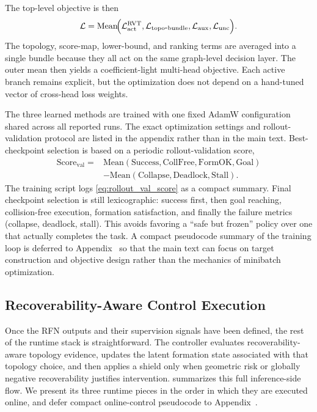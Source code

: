 \documentclass{ieeeaccess}
\begin{document}
The top-level objective is then
\begin{equation}
\mathcal{L}
= \mathrm{Mean}\!\Bigl(
\mathcal{L}^{\mathrm{RVT}}_{\mathrm{act}},
\mathcal{L}_{\mathrm{topo\mbox{-}bundle}},
\mathcal{L}_{\mathrm{aux}},
\mathcal{L}_{\mathrm{unc}}
\Bigr).
\label{eq:loss}
\end{equation}
The topology, score-map, lower-bound, and ranking terms are averaged
into a single bundle because they all act on the same graph-level
decision layer. The outer mean then yields a coefficient-light
multi-head objective. Each active branch remains explicit, but the
optimization does not depend on a hand-tuned vector of cross-head loss
weights.

The three learned methods are trained with one fixed AdamW
configuration shared across all reported runs. The exact optimization
settings and rollout-validation protocol are listed in the appendix
rather than in the main text. Best-checkpoint selection is based on a
periodic rollout-validation score,
\begin{equation}
\begin{aligned}
\mathrm{Score}_{\mathrm{val}} ={}&
\mathrm{Mean}(\mathrm{Success}, \mathrm{CollFree}, \mathrm{FormOK}, \mathrm{Goal}) \\
&- \mathrm{Mean}(\mathrm{Collapse}, \mathrm{Deadlock}, \mathrm{Stall}).
\end{aligned}
\label{eq:rollout_val_score}
\end{equation}
The training script logs \eqref{eq:rollout_val_score} as a compact
summary. Final checkpoint selection is still lexicographic: success
first, then goal reaching, collision-free execution, formation
satisfaction, and finally the failure metrics (collapse, deadlock,
stall). This avoids favoring a ``safe but frozen'' policy over one that
actually completes the task. A compact pseudocode summary of the
training loop is deferred to Appendix~ so
that the main text can focus on target construction and objective
design rather than the mechanics of minibatch optimization.

\subsection{Recoverability-Aware Control Execution}
\label{sec:control_execution}

Once the RFN outputs and their supervision signals have been defined,
the rest of the runtime stack is straightforward. The controller
evaluates recoverability-aware topology evidence, updates the latent
formation state associated with that topology choice, and then applies
a shield only when geometric risk or globally negative recoverability
justifies intervention.  summarizes this full
inference-side flow. We present its three runtime pieces in the order
in which they are executed online, and defer compact online-control
pseudocode to Appendix~.
\end{document}
